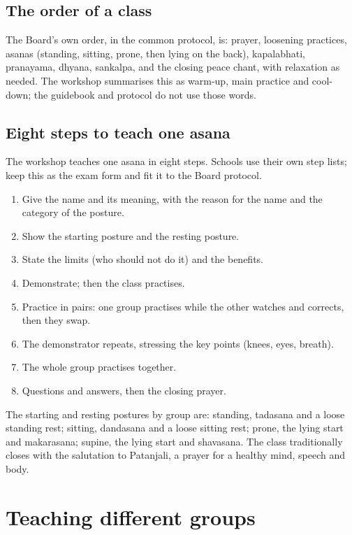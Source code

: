 \subsection*{The order of a class}
The Board's own order, in the common protocol, is: prayer, loosening practices, asanas (standing, sitting, prone, then lying on the back), kapalabhati, pranayama, dhyana, sankalpa, and the closing peace chant, with relaxation as needed. The workshop summarises this as warm-up, main practice and cool-down; the guidebook and protocol do not use those words.

\subsection*{Eight steps to teach one asana}
The workshop teaches one asana in eight steps. Schools use their own step lists; keep this as the exam form and fit it to the Board protocol.
\begin{enumerate}
\item Give the name and its meaning, with the reason for the name and the category of the posture.
\item Show the starting posture and the resting posture.
\item State the limits (who should not do it) and the benefits.
\item Demonstrate; then the class practises.
\item Practice in pairs: one group practises while the other watches and corrects, then they swap.
\item The demonstrator repeats, stressing the key points (knees, eyes, breath).
\item The whole group practises together.
\item Questions and answers, then the closing prayer.
\end{enumerate}

The starting and resting postures by group are: standing, tadasana and a loose standing rest; sitting, dandasana and a loose sitting rest; prone, the lying start and makarasana; supine, the lying start and shavasana. The class traditionally closes with the salutation to Patanjali, a prayer for a healthy mind, speech and body.

\section{Teaching different groups}

